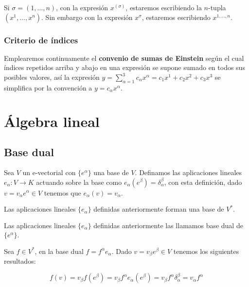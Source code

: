 \begin{notation}
  Si $\sigma=(1,\ldots,n)$, con la expresión $x^{(\sigma)}$, estaremos escribiendo la $n$-tupla $(x^1,\ldots,x^n)$.
  Sin embargo con la expresión $x^\sigma$, estaremos escribiendo $x^{1,\ldots,n}$.
\end{notation}

\subsection{Criterio de índices}\label{subsec:criterio-de-indices}

Emplearemos continuamente el \textbf{convenio de sumas de Einstein} según el cual
índices repetidos arriba y abajo en una expresión se supone sumado en todos sus posibles valores,
así la expresión $y=\sum_{\alpha=1}^3 c_\alpha x^\alpha=c_1 x^1 + c_2 x^2 + c_3 x^3$
se simplifica por la convención a $y = c_\alpha x^\alpha$.


\chapter{Álgebra lineal}\label{ch:algebra-lineal}


\section{Base dual}\label{sec:base-dual}

Sea $V$ un e-vectorial con $\{e^\alpha\}$ una base de $V$.
Definamos las aplicaciones lineales $e_\alpha: V \longrightarrow K$ actuando sobre la base
como $e_\alpha(e^\beta)=\delta_\alpha^\beta$, con esta definición, dado $v=v_\alpha e^\alpha\in V$ tenemos
que $e_\alpha(v)=v_\alpha$.

\begin{exercise}
  Las aplicaciones lineales $\{e_\alpha\}$ definidas anteriormente forman una base de $V^*$.
\end{exercise}

\begin{definition}
  Las aplicaciones lineales $\{e_\alpha\}$ definidas anteriormente las llamamos base dual de $\{e^\alpha\}$.
\end{definition}

Sea $f\in V^*$, en la base dual $f=f^\alpha e_\alpha$.
Dado $v=v_\beta e^\beta\in V$ tenemos los siguientes resultados:

\begin{equation*}
  f(v)=v_\beta f(e^\beta)=v_\beta f^\alpha e_\alpha(e^\beta)=
  v_\beta f^\alpha \delta_\alpha^\beta=v_\alpha f^\alpha
\end{equation*}

